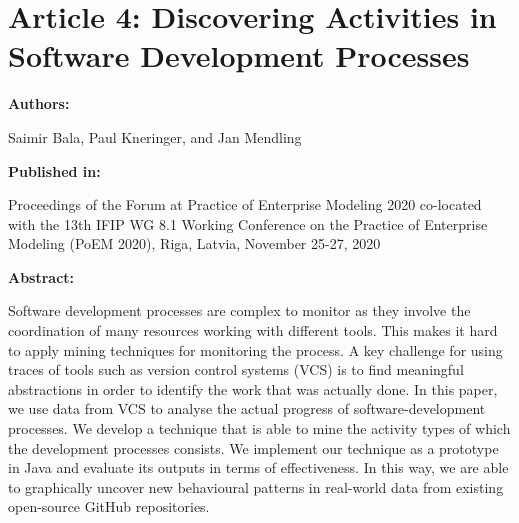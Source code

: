 \chapter{Article 4: Discovering Activities in Software Development Processes}
\label{chap:project-mining2}

{\bfseries \Large Authors: \medskip}

\noindent Saimir Bala,
Paul Kneringer, and
Jan Mendling \hfill

\bigskip

{\noindent\bfseries \Large Published in: \medskip}

\noindent Proceedings of the Forum at Practice of Enterprise Modeling 2020 co-located
with the 13th {IFIP} {WG} 8.1 Working Conference on the Practice of
Enterprise Modeling (PoEM 2020), Riga, Latvia, November 25-27, 2020

\bigskip

{\noindent\bfseries \Large Abstract: \medskip}


\noindent Software development processes are complex to monitor as they involve the coordination of many resources working with different tools.
This makes it hard to apply mining techniques for monitoring the process. 
A key challenge for using traces of tools such as version control systems (VCS) is to find meaningful abstractions in order to identify the work that was actually done. 
In this paper, we use data from VCS to analyse the actual progress of software-development processes. We develop a technique that is able to mine the activity types of which the development processes consists. 
We implement our technique as a prototype in Java and evaluate its outputs in terms of effectiveness.
In this way, we are able to graphically uncover new behavioural patterns in real-world data from existing open-source GitHub repositories.

\pagebreak


%

%





